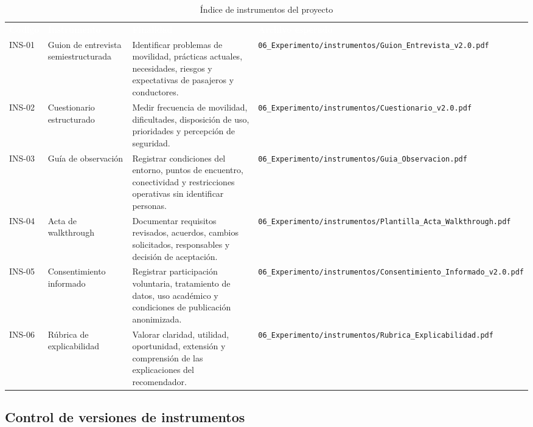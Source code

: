 \documentclass[12pt,a4paper]{article}
\begin{document}
\begin{table}[H]
\centering
\caption{Índice de instrumentos del proyecto}
\label{tab:indice-instrumentos}
\small
{}
\begin{tabularx}{\textwidth}{L{1.45cm} L{3.10cm} Y L{3.25cm}}
\textcolor{white}{\textbf{Código}} &
\textcolor{white}{\textbf{Instrumento}} &
\textcolor{white}{\textbf{Finalidad}} &
\textcolor{white}{\textbf{Archivo esperado}}\\
INS-01 & Guion de entrevista semiestructurada & Identificar problemas de movilidad, prácticas actuales, necesidades, riesgos y expectativas de pasajeros y conductores. & \nolinkurl{06_Experimento/instrumentos/Guion_Entrevista_v2.0.pdf}\\
INS-02 & Cuestionario estructurado & Medir frecuencia de movilidad, dificultades, disposición de uso, prioridades y percepción de seguridad. & \nolinkurl{06_Experimento/instrumentos/Cuestionario_v2.0.pdf}\\
INS-03 & Guía de observación & Registrar condiciones del entorno, puntos de encuentro, conectividad y restricciones operativas sin identificar personas. & \nolinkurl{06_Experimento/instrumentos/Guia_Observacion.pdf}\\
INS-04 & Acta de walkthrough & Documentar requisitos revisados, acuerdos, cambios solicitados, responsables y decisión de aceptación. & \nolinkurl{06_Experimento/instrumentos/Plantilla_Acta_Walkthrough.pdf}\\
INS-05 & Consentimiento informado & Registrar participación voluntaria, tratamiento de datos, uso académico y condiciones de publicación anonimizada. & \nolinkurl{06_Experimento/instrumentos/Consentimiento_Informado_v2.0.pdf}\\
INS-06 & Rúbrica de explicabilidad & Valorar claridad, utilidad, oportunidad, extensión y comprensión de las explicaciones del recomendador. & \nolinkurl{06_Experimento/instrumentos/Rubrica_Explicabilidad.pdf}\\
\end{tabularx}
\end{table}

\subsection{Control de versiones de instrumentos}
\end{document}
